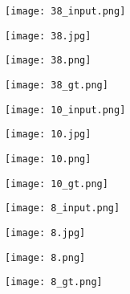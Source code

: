 \documentclass{article}
\begin{document}
\begin{figure*}[!t]
\captionsetup[subfigure]{labelformat=empty}
\centering
 \begin{subfigure}[b]{0.22\textwidth}
    \texttt{[image: 38\_input.png]}%
    \label{fig_first_case}
\end{subfigure}
 \begin{subfigure}[b]{0.22\textwidth}
    \texttt{[image: 38.jpg]}%
    \label{fig_first_case}
\end{subfigure}
 \begin{subfigure}[b]{0.22\textwidth}
    \texttt{[image: 38.png]}%
    \label{fig_first_case}
\end{subfigure}
 \begin{subfigure}[b]{0.22\textwidth}
    \texttt{[image: 38\_gt.png]}%
    \label{fig_first_case}
\end{subfigure}
 \begin{subfigure}[b]{0.22\textwidth}
    \texttt{[image: 10\_input.png]}%
    \label{fig_first_case}
\end{subfigure}
 \begin{subfigure}[b]{0.22\textwidth}
    \texttt{[image: 10.jpg]}%
    \label{fig_first_case}
\end{subfigure}
 \begin{subfigure}[b]{0.22\textwidth}
    \texttt{[image: 10.png]}%
    \label{fig_first_case}
\end{subfigure}
 \begin{subfigure}[b]{0.22\textwidth}
    \texttt{[image: 10\_gt.png]}%
    \label{fig_first_case}
\end{subfigure}
\begin{subfigure}[b]{0.22\textwidth}
    \texttt{[image: 8\_input.png]}%
    \label{fig_first_case}
\end{subfigure}
 \begin{subfigure}[b]{0.22\textwidth}
    \texttt{[image: 8.jpg]}%
    \label{fig_first_case}
\end{subfigure}
 \begin{subfigure}[b]{0.22\textwidth}
    \texttt{[image: 8.png]}%
    \label{fig_first_case}
\end{subfigure}
 \begin{subfigure}[b]{0.22\textwidth}
    \texttt{[image: 8\_gt.png]}%
    \label{fig_first_case}
\end{subfigure}

\end{figure*}
\end{document}
